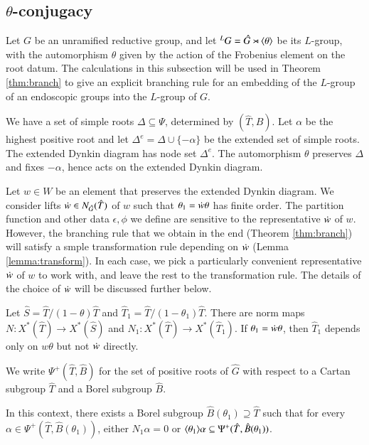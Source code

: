 \subsection{$\theta$-conjugacy}

Let $G$ be an unramified reductive group, and let ${}^LG = \hat G
\rtimes \langle{\theta}\rangle$ be its $L$-group, with the automorphism $\theta$
given by the action of the Frobenius element on the root datum.  
The calculations in this subsection will be used in Theorem
\ref{thm:branch} to give an explicit branching rule for an embedding of
the $L$-group of an endoscopic groups into the $L$-group of $G$.

We have a set of simple roots $\Delta\subseteq \Psi$, determined by
$(\hat T,\hat B)$.  Let $\alpha$ be the highest positive root and let
$\Delta^e = \Delta \cup \{-\alpha\}$ be the extended set of simple
roots.  The extended Dynkin diagram has node set $\Delta^e$.  The
automorphism $\theta$ preserves $\Delta$ and fixes $-\alpha$, hence
acts on the extended Dynkin diagram.

Let $w\in W$ be an element that preserves the extended Dynkin diagram.
We consider lifts $\dot w\in N_{\hat G}(\hat T)$ of $w$ such that
$\theta_1 = \dot w \theta$ has finite order.  The partition function
and other data $\epsilon,\phi$ we define are sensitive to the
representative $\dot w$ of $w$.  However, the branching rule that we
obtain in the end (Theorem \ref{thm:branch}) will satisfy a smple
transformation rule depending on $\dot w$ (Lemma
\ref{lemma:transform}).  In each case, we pick a particularly
convenient representative $\dot w$ of $w$ to work with, and leave the
rest to the transformation rule.  The details of the choice of $\dot w$
will be discussed further below.

Let $\hat S = \hat T/(1-\theta)\hat T$ and $\hat T_1 = \hat
T/(1-\theta_1)\hat T$.  There are norm maps $N:X^*(\hat T)\to X^*(\hat
S)$ and $N_1:X^*(\hat T)\to X^*(\hat T_1)$.  If $\theta_1 =\dot w\theta$,
then $\hat T_1$ depends only on $w\theta$ but not $\dot w$ directly.


We write $\Psi^+(\hat T,\hat B)$ for the set of positive roots of
$\hat G$ with respect to a Cartan subgroup $\hat T$ and a Borel subgroup
$\hat B$.

\begin{lemma}\label{lemma:adapted}
  In this context, there exists a Borel subgroup $\hat
  B(\theta_1)\supseteq \hat T$ such that for every
  $\alpha\in\Psi^+(\hat T,\hat B(\theta_1))$, either $N_1\alpha = 0$
  or $\langle{\theta_1}\rangle\alpha\subseteq \Psi^+(\hat T,\hat B(\theta_1))$.
\end{lemma}

